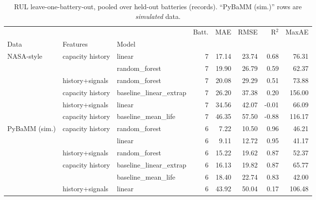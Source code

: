 \begin{table}[htbp]\centering\footnotesize
\begin{tabular}{lllrrrrr}
\toprule
 &  &  & Batt. & MAE & RMSE & R$^2$ & MaxAE \\
Data & Features & Model &  &  &  &  &  \\
\midrule
\multirow[t]{6}{*}{NASA-style} & \multirow[t]{2}{*}{capacity history} & linear & 7 & 17.14 & 23.74 & 0.68 & 76.31 \\
 &  & random\_forest & 7 & 19.90 & 26.79 & 0.59 & 62.37 \\
\cline{2-8}
 & history+signals & random\_forest & 7 & 20.08 & 29.29 & 0.51 & 73.88 \\
\cline{2-8}
 & capacity history & baseline\_linear\_extrap & 7 & 26.20 & 37.38 & 0.20 & 156.00 \\
\cline{2-8}
 & history+signals & linear & 7 & 34.56 & 42.07 & -0.01 & 66.09 \\
\cline{2-8}
 & capacity history & baseline\_mean\_life & 7 & 46.35 & 57.50 & -0.88 & 116.17 \\
\cline{1-8} \cline{2-8}
\multirow[t]{6}{*}{PyBaMM (sim.)} & \multirow[t]{2}{*}{capacity history} & random\_forest & 6 & 7.22 & 10.50 & 0.96 & 46.21 \\
 &  & linear & 6 & 9.11 & 12.72 & 0.95 & 41.17 \\
\cline{2-8}
 & history+signals & random\_forest & 6 & 15.22 & 19.62 & 0.87 & 52.37 \\
\cline{2-8}
 & \multirow[t]{2}{*}{capacity history} & baseline\_linear\_extrap & 6 & 16.13 & 19.82 & 0.87 & 65.77 \\
 &  & baseline\_mean\_life & 6 & 18.40 & 22.74 & 0.83 & 42.00 \\
\cline{2-8}
 & history+signals & linear & 6 & 43.92 & 50.04 & 0.17 & 106.48 \\
\cline{1-8} \cline{2-8}
\bottomrule
\end{tabular}
\caption{RUL leave-one-battery-out, pooled over held-out batteries (records). ``PyBaMM (sim.)'' rows are \emph{simulated} data.}\label{tab:tab_aging_rul}
\end{table}
